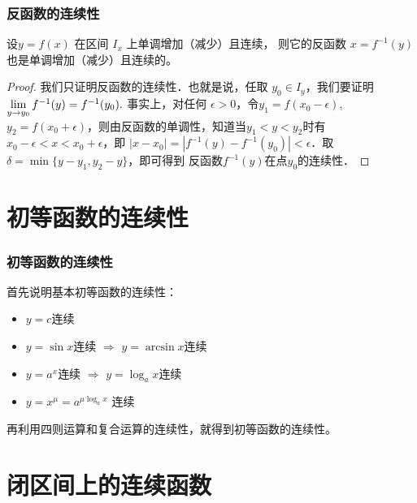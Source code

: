 \documentclass[14pt,notheorems,leqno,xcolor={rgb}]{beamer} %
\begin{document}
\begin{frame}
\frametitle{反函数的连续性}
\begin{theorem*}
设$y=f(x)$ 在区间 $I_x$ 上单调增加（减少）且连续，
则它的反函数 $x=f^{-1}(y)$  也是单调增加（减少）且连续的。
\end{theorem*}
\pause%
\begin{proof}
我们只证明反函数的连续性．也就是说，任取 $y_0\in I_y$，我们要证明
$\lim\limits_{y\to y_0}f^{-1}(y)=f^{-1}(y_0). $
\ppause
事实上，对任何 $\epsilon>0$，令$y_1=f(x_0-\epsilon)$, $y_2=f(x_0+\epsilon)$，则由反函数的单调性，知道当$y_1<y<y_2$时有
$x_0-\epsilon<x<x_0+\epsilon$，即 $|x-x_0|=|f^{-1}(y)-f^{-1}(y_0)|<\epsilon$．取$\delta=\min\{y-y_1, y_2-y\}$，即可得到
反函数$f^{-1}(y)$在点$y_0$的连续性．
\end{proof}
\end{frame}

\section{初等函数的连续性}

\begin{frame}
\frametitle{初等函数的连续性}
首先说明基本初等函数的连续性：
\begin{itemize}
  \item $y=c$连续
  \item $y=\sin x$连续 $\Longrightarrow$ $y=\arcsin x$连续
  \item $y=a^x$连续 $\Longrightarrow$ $y=\log_a x$连续
  \item $y=x^\mu = a^{\mu\log_a x}$ 连续
\end{itemize}
再利用四则运算和复合运算的连续性，就得到初等函数的连续性。
\end{frame}

\section{闭区间上的连续函数}
\end{document}
